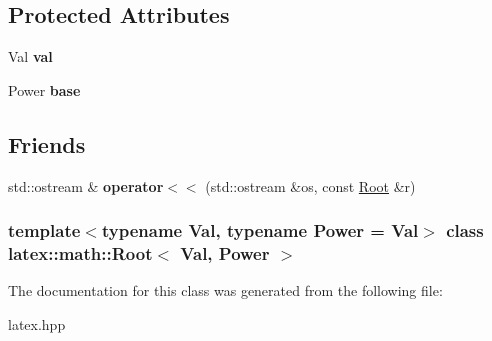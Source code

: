 \subsection*{\-Protected \-Attributes}
\begin{DoxyCompactItemize}
\item 
\hypertarget{classlatex_1_1math_1_1Root_ae90dc3215a792f70e39fa7c9b5308197}{\-Val {\bfseries val}}\label{classlatex_1_1math_1_1Root_ae90dc3215a792f70e39fa7c9b5308197}

\item 
\hypertarget{classlatex_1_1math_1_1Root_a61e42eb68a4383059f6510d95b7d8163}{\-Power {\bfseries base}}\label{classlatex_1_1math_1_1Root_a61e42eb68a4383059f6510d95b7d8163}

\end{DoxyCompactItemize}
\subsection*{\-Friends}
\begin{DoxyCompactItemize}
\item 
\hypertarget{classlatex_1_1math_1_1Root_a74f0bf7df3ef1d4ca32576d6f0a2152b}{std\-::ostream \& {\bfseries operator$<$$<$} (std\-::ostream \&os, const \hyperlink{classlatex_1_1math_1_1Root}{\-Root} \&r)}\label{classlatex_1_1math_1_1Root_a74f0bf7df3ef1d4ca32576d6f0a2152b}

\end{DoxyCompactItemize}
\subsubsection*{template$<$typename \-Val, typename \-Power = \-Val$>$ class latex\-::math\-::\-Root$<$ Val, Power $>$}



\-The documentation for this class was generated from the following file\-:\begin{DoxyCompactItemize}
\item 
latex.\-hpp\end{DoxyCompactItemize}
